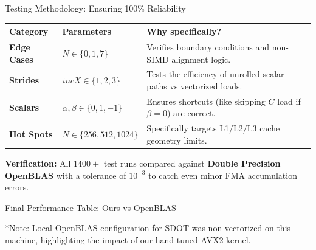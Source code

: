 \documentclass[aspectratio=169]{beamer}
\begin{document}
\begin{frame}{Testing Methodology: Ensuring 100\% Reliability}
  \begin{center}
    \begin{tabular}{|l|l|p{5.5cm}|}
      \hline
      \textbf{Category} & \textbf{Parameters} & \textbf{Why specifically?} \\
      \hline
      \textbf{Edge Cases} & $N \in \{0, 1, 7\}$ & Verifies boundary conditions and non-SIMD alignment logic. \\
      \hline
      \textbf{Strides} & $incX \in \{1, 2, 3\}$ & Tests the efficiency of unrolled scalar paths vs vectorized loads. \\
      \hline
      \textbf{Scalars} & $\alpha, \beta \in \{0, 1, -1\}$ & Ensures shortcuts (like skipping $C$ load if $\beta=0$) are correct. \\
      \hline
      \textbf{Hot Spots} & $N \in \{256, 512, 1024\}$ & Specifically targets L1/L2/L3 cache geometry limits. \\
      \hline
    \end{tabular}
  \end{center}
  \textbf{Verification:} All $1400+$ test runs compared against \textbf{Double Precision OpenBLAS} with a tolerance of $10^{-3}$ to catch even minor FMA accumulation errors.
\end{frame}

\begin{frame}{Final Performance Table: Ours vs OpenBLAS}
  \begin{center}
  \end{center}
  \footnotesize{*Note: Local OpenBLAS configuration for SDOT was non-vectorized on this machine, highlighting the impact of our hand-tuned AVX2 kernel.}
\end{frame}
\end{document}
